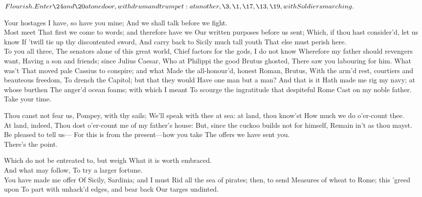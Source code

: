 \documentclass{book}
\begin{document}

	\(Flourish. Enter \24 and \20 at one door,
	with drum and trumpet: at another, \3, \1, \17, \13, \19,
	with Soldiers marching.\)

	Your hostages I have, so have you mine;
	And we shall talk before we fight. \\

\3	Most meet
	That first we come to words; and therefore have we
	Our written purposes before us sent;
	Which, if thou hast consider'd, let us know
	If 'twill tie up thy discontented sword,
	And carry back to Sicily much tall youth
	That else must perish here. \\

	To you all three,
	The senators alone of this great world,
	Chief factors for the gods, I do not know
	Wherefore my father should revengers want,
	Having a son and friends; since Julius Caesar,
	Who at Philippi the good Brutus ghosted,
	There saw you labouring for him. What was't
	That moved pale Cassius to conspire; and what
	Made the all-honour'd, honest Roman, Brutus,
	With the arm'd rest, courtiers and beauteous freedom,
	To drench the Capitol; but that they would
	Have one man but a man? And that is it
	Hath made me rig my navy; at whose burthen
	The anger'd ocean foams; with which I meant
	To scourge the ingratitude that despiteful Rome
	Cast on my noble father. \\

\3	Take your time.

\1	Thou canst not fear us, Pompey, with thy sails;
	We'll speak with thee at sea: at land, thou know'st
	How much we do o'er-count thee. \\

	At land, indeed,
	Thou dost o'er-count me of my father's house:
	But, since the cuckoo builds not for himself,
	Remain in't as thou mayst. \\

	Be pleased to tell us---
	For this is from the present---how you take
	The offers we have sent you. \\

\3	There's the point.

\1	Which do not be entreated to, but weigh
	What it is worth embraced. \\

\3	And what may follow,
	To try a larger fortune.  \\

	You have made me offer
	Of Sicily, Sardinia; and I must
	Rid all the sea of pirates; then, to send
	Measures of wheat to Rome; this 'greed upon
	To part with unhack'd edges, and bear back
	Our targes undinted.  \\
\end{document}
